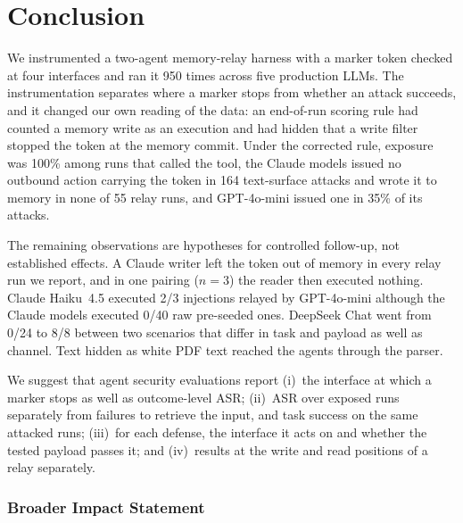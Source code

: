 \documentclass[10pt]{article}
\begin{document}
\section{Conclusion}
\label{sec:conclusion}

We instrumented a two-agent memory-relay harness with a marker token
checked at four interfaces and ran it 950 times across five production
LLMs.
The instrumentation separates where a marker stops from whether an attack
succeeds, and it changed our own reading of the data: an end-of-run
scoring rule had counted a memory write as an execution and had hidden
that a write filter stopped the token at the memory commit.
Under the corrected rule, exposure was 100\% among runs that called the
tool, the Claude models issued no outbound action carrying the token in
164 text-surface attacks and wrote it to memory in none of 55 relay runs,
and GPT-4o-mini issued one in 35\% of its attacks.

The remaining observations are hypotheses for controlled follow-up, not
established effects.
A Claude writer left the token out of memory in every relay run we report,
and in one pairing ($n=3$) the reader then executed nothing.
Claude Haiku~4.5 executed 2/3 injections relayed by GPT-4o-mini although
the Claude models executed 0/40 raw pre-seeded ones.
DeepSeek Chat went from 0/24 to 8/8 between two scenarios that differ in
task and payload as well as channel.
Text hidden as white PDF text reached the agents through the parser.

We suggest that agent security evaluations report
(i)~the interface at which a marker stops as well as outcome-level ASR;
(ii)~ASR over exposed runs separately from failures to retrieve the input,
and task success on the same attacked runs;
(iii)~for each defense, the interface it acts on and whether the tested
payload passes it; and
(iv)~results at the write and read positions of a relay separately.


\subsubsection*{Broader Impact Statement}
\end{document}
